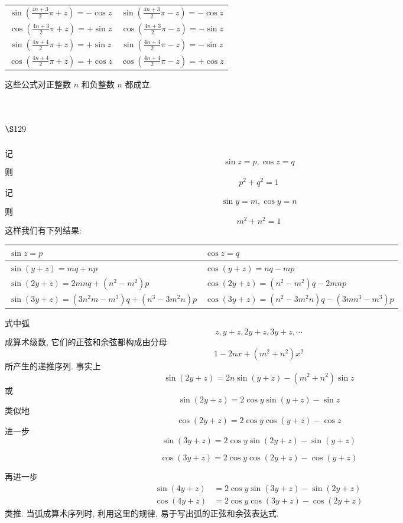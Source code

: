 \begin{tabular}{c|c}
\hline $\sin \left(\frac{4 n+3}{2} \pi+z\right)=-\cos z$ & $\sin \left(\frac{4 n+3}{2} \pi-z\right)=-\cos z$ \\
$\cos \left(\frac{4 n+3}{2} \pi+z\right)=+\sin z$ & $\cos \left(\frac{4 n+3}{2} \pi-z\right)=-\sin z$ \\
\hline $\sin \left(\frac{4 n+4}{2} \pi+z\right)=+\sin z$ & $\sin \left(\frac{4 n+4}{2} \pi-z\right)=-\sin z$ \\
$\cos \left(\frac{4 n+4}{2} \pi+z\right)=+\cos z$ & $\cos \left(\frac{4 n+4}{2} \pi-z\right)=+\cos z$ \\
\hline
\end{tabular}

这些公式对正整数 $n$ 和负整数 $n$ 都成立.

\section{$\S 129$}
记
\[
\sin z=p, \cos z=q
\]
则
\[
p^{2}+q^{2}=1
\]
记
\[
\sin y=m, \cos y=n
\]
则
\[
m^{2}+n^{2}=1
\]
这样我们有下列结果:

\begin{tabular}{l|l}
\hline $\sin z=p$ & $\cos z=q$ \\
\hline $\sin (y+z)=m q+n p$ & $\cos (y+z)=n q-m p$ \\
\hline $\sin (2 y+z)=2 m n q+\left(n^{2}-m^{2}\right) p$ & $\cos (2 y+z)=\left(n^{2}-m^{2}\right) q-2 m n p$ \\
\hline $\sin (3 y+z)=\left(3 n^{2} m-m^{3}\right) q+\left(n^{3}-3 m^{2} n\right) p$ & $\cos (3 y+z)=\left(n^{2}-3 m^{2} n\right) q-\left(3 m n^{3}-m^{3}\right) p$ \\
\hline
\end{tabular}

式中弧
\[
z, y+z, 2 y+z, 3 y+z, \cdots
\]
成算术级数, 它们的正弦和余弦都构成由分母
\[
1-2 n x+\left(m^{2}+n^{2}\right) x^{2}
\]
所产生的递推序列. 事实上
\[
\sin (2 y+z)=2 n \sin (y+z)-\left(m^{2}+n^{2}\right) \sin z
\]
或
\[
\sin (2 y+z)=2 \cos y \sin (y+z)-\sin z
\]
类似地
\[
\cos (2 y+z)=2 \cos y \cos (y+z)-\cos z
\]
进一步
\[
\sin (3 y+z)=2 \cos y \sin (2 y+z)-\sin (y+z)
\]

\[
\cos (3 y+z)=2 \cos y \cos (2 y+z)-\cos (y+z)
\]

再进一步
\[
\begin{aligned}
\sin (4 y+z) & =2 \cos y \sin (3 y+z)-\sin (2 y+z) \\
\cos (4 y+z) & =2 \cos y \cos (3 y+z)-\cos (2 y+z)
\end{aligned}
\]
类推. 当弧成算术序列时, 利用这里的规律, 易于写出弧的正弦和余弦表达式.

